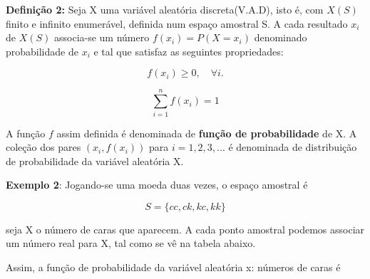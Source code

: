 \textbf{Definição 2:} Seja X uma variável aleatória
discreta(V.A.D), isto é, com $X(S)$ finito e infinito enumerável,
definida num espaço amostral S. A cada resultado $x_{i}$ de $X(S)$
associa-se um número $f(x_{i})=P(X=x_{i})$ denominado
probabilidade de $x_{i}$ e tal que satisfaz as seguintes
propriedades:


$$
f(x_{i}) \geq 0, \quad \forall i.
$$

$$
\sum_{i=1}^{n}f(x_{i})=1
$$


A função $f$ assim definida é denominada de \textbf{função de
probabilidade} de X. A coleção dos pares $(x_{i}, f(x_{i}))$ para
$i=1,2,3,...$ é denominada de distribuição de probabilidade da
variável aleatória X.\vskip0.3cm

\textbf{Exemplo 2}: Jogando-se uma moeda duas vezes, o espaço
amostral é

$$
S= \{ cc, ck, kc, kk \}
$$

seja X o número de caras que aparecem. A cada ponto amostral
podemos associar um número real para X, tal como se vê na tabela
abaixo.


\begin{table}[!htb]
\end{table}



Assim, a função de probabilidade da variável aleatória x: números
de caras é

\begin{table}[!htb]
\end{table}


